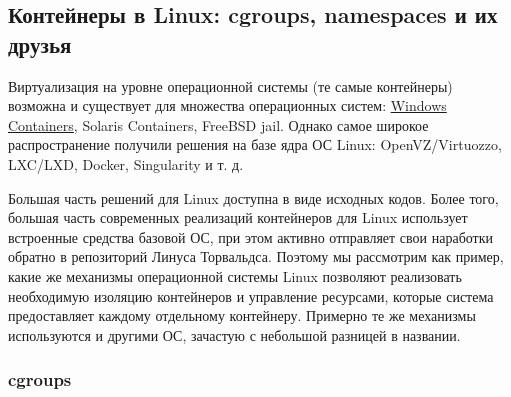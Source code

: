 \documentclass[14pt, a4paper]{article}
\begin{document}
\subsection*{Контейнеры в Linux: cgroups, namespaces и их друзья}

Виртуализация на уровне операционной системы (те самые контейнеры) возможна и существует для
множества операционных систем: \href{https://docs.microsoft.com/en-us/virtualization/windowscontainers/about/}{Windows Containers}, Solaris Containers, FreeBSD jail. Однако самое
широкое распространение получили решения на базе ядра ОС Linux: OpenVZ/Virtuozzo, LXC/LXD,
Docker, Singularity и т. д.

Большая часть решений для Linux доступна в виде исходных кодов. Более того, большая часть
современных реализаций контейнеров для Linux использует встроенные средства базовой ОС, при
этом активно отправляет свои наработки обратно в репозиторий Линуса Торвальдса. Поэтому мы
рассмотрим как пример, какие же механизмы операционной системы Linux позволяют реализовать
необходимую изоляцию контейнеров и управление ресурсами, которые система предоставляет
каждому отдельному контейнеру. Примерно те же механизмы используются и другими ОС, зачастую с
небольшой разницей в названии.


\begin{figure}[h]%
    \centering
    \label{framework} %
\end{figure}


\subsubsection*{\textbf{cgroups}}
\end{document}
